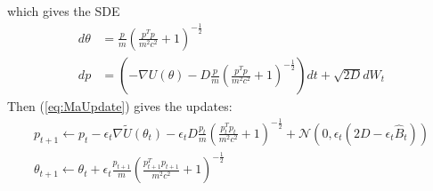 which gives the SDE
\begin{eqnarray}
d \theta &= \frac{p}{m}\left(\frac{p^Tp}{m^2c^2}+1\right)^{-\frac{1}{2}}\\
dp &= \left(-\nabla U(\theta)-D\frac{p}{m}\left(\frac{p^Tp}{m^2c^2}+1\right)^{-\frac{1}{2}} \right)dt +\sqrt{2D}dW_t
\end{eqnarray}
Then (\ref{eq:MaUpdate}) gives the updates:
\begin{eqnarray}
p_{t+1} \leftarrow p_t - \epsilon_t \nabla \tilde{U}(\theta_t) -\epsilon_t D \frac{p_t}{m}\left(\frac{p_t^Tp_t}{m^2c^2}+1\right)^{-\frac{1}{2}}+\mathcal{N}(0,\epsilon_t(2D-\epsilon_t \hat{B}_t))\\
\theta_{t+1} \leftarrow \theta_t + \epsilon_t \frac{p_{t+1}}{m}\left(\frac{p_{t+1}^Tp_{t+1}}{m^2c^2}+1\right)^{-\frac{1}{2}}
\end{eqnarray}
